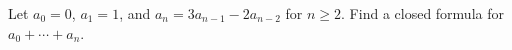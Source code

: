 Let $a_0=0$, $a_1=1$, and $a_n=3a_{n-1}-2a_{n-2}$ for $n\ge2$. Find a closed formula for $a_0+\cdots+a_n$.
